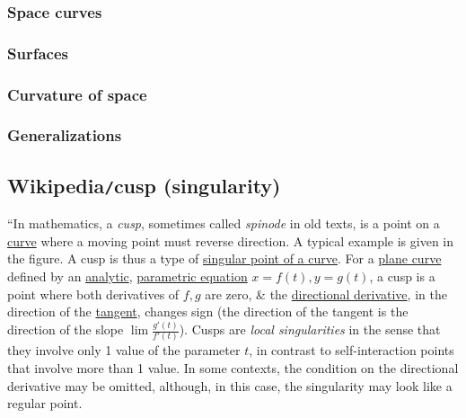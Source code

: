 \documentclass{article}
\begin{document}
\subsubsection{Space curves}

\subsubsection{Surfaces}

\subsubsection{Curvature of space}

\subsubsection{Generalizations}


\subsection{Wikipedia{\tt/}cusp (singularity)}
``In mathematics, a {\it cusp}, sometimes called {\it spinode} in old texts, is a point on a \href{https://en.wikipedia.org/wiki/Curve}{curve} where a moving point must reverse direction. A typical example is given in the figure. A cusp is thus a type of \href{https://en.wikipedia.org/wiki/Singular_point_of_a_curve}{singular point of a curve}. For a \href{https://en.wikipedia.org/wiki/Plane_curve}{plane curve} defined by an \href{https://en.wikipedia.org/wiki/Analytic_function}{analytic}, \href{https://en.wikipedia.org/wiki/Parametric_equation}{parametric equation} $x = f(t),y = g(t)$, a cusp is a point where both derivatives of $f,g$ are zero, \& the \href{https://en.wikipedia.org/wiki/Directional_derivative}{directional derivative}, in the direction of the \href{https://en.wikipedia.org/wiki/Tangent}{tangent}, changes sign (the direction of the tangent is the direction of the slope $\lim \frac{g'(t)}{f'(t)}$). Cusps are {\it local singularities} in the sense that they involve only 1 value of the parameter $t$, in contrast to self-interaction points that involve more than 1 value. In some contexts, the condition on the directional derivative may be omitted, although, in this case, the singularity may look like a regular point.
\end{document}

